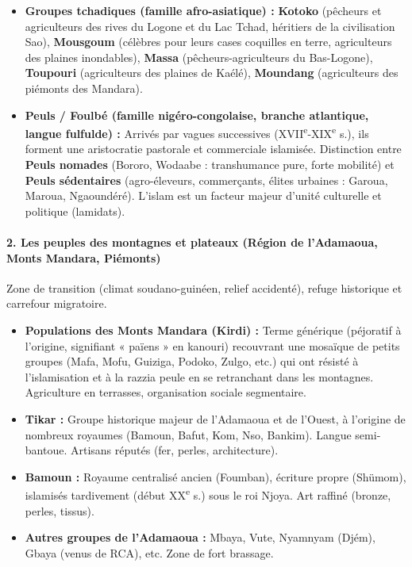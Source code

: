 \documentclass[11pt]{article}
\begin{document}
\begin{itemize}
    \item \textbf{Groupes tchadiques (famille afro-asiatique) :} \textbf{Kotoko} (pêcheurs et agriculteurs des rives du Logone et du Lac Tchad, héritiers de la civilisation Sao), \textbf{Mousgoum} (célèbres pour leurs cases coquilles en terre, agriculteurs des plaines inondables), \textbf{Massa} (pêcheurs-agriculteurs du Bas-Logone), \textbf{Toupouri} (agriculteurs des plaines de Kaélé), \textbf{Moundang} (agriculteurs des piémonts des Mandara).
    \item \textbf{Peuls / Foulbé (famille nigéro-congolaise, branche atlantique, langue fulfulde) :} Arrivés par vagues successives (XVII\textsuperscript{e}-XIX\textsuperscript{e} s.), ils forment une aristocratie pastorale et commerciale islamisée. Distinction entre \textbf{Peuls nomades} (Bororo, Wodaabe : transhumance pure, forte mobilité) et \textbf{Peuls sédentaires} (agro-éleveurs, commerçants, élites urbaines : Garoua, Maroua, Ngaoundéré). L'islam est un facteur majeur d'unité culturelle et politique (lamidats).
\end{itemize}

\paragraph{2. Les peuples des montagnes et plateaux (Région de l'Adamaoua, Monts Mandara, Piémonts)}
Zone de transition (climat soudano-guinéen, relief accidenté), refuge historique et carrefour migratoire.

\begin{itemize}
    \item \textbf{Populations des Monts Mandara (Kirdi) :} Terme générique (péjoratif à l'origine, signifiant « païens » en kanouri) recouvrant une mosaïque de petits groupes (Mafa, Mofu, Guiziga, Podoko, Zulgo, etc.) qui ont résisté à l'islamisation et à la razzia peule en se retranchant dans les montagnes. Agriculture en terrasses, organisation sociale segmentaire.
    \item \textbf{Tikar :} Groupe historique majeur de l'Adamaoua et de l'Ouest, à l'origine de nombreux royaumes (Bamoun, Bafut, Kom, Nso, Bankim). Langue semi-bantoue. Artisans réputés (fer, perles, architecture).
    \item \textbf{Bamoun :} Royaume centralisé ancien (Foumban), écriture propre (Shümom), islamisés tardivement (début XX\textsuperscript{e} s.) sous le roi Njoya. Art raffiné (bronze, perles, tissus).
    \item \textbf{Autres groupes de l'Adamaoua :} Mbaya, Vute, Nyamnyam (Djém), Gbaya (venus de RCA), etc. Zone de fort brassage.
\end{itemize}
\end{document}
